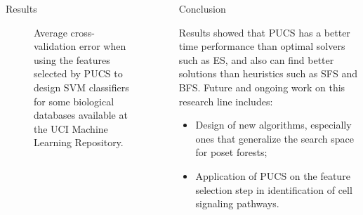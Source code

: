 \begin{frame}
\begin{columns}
{\begin{block}{Results}
\begin{figure}[h]
\centering
{}
\caption{Average cross-validation error when using the features selected by
    PUCS to design SVM classifiers for some biological databases available at the UCI Machine Learning Repository.}
\label{fig:svm_error}
\end{figure}

\end{block}



\begin{block}{Conclusion}%
{
Results showed that PUCS has a better time performance than optimal solvers such as ES, and also can find better solutions than heuristics such as SFS and BFS. Future and ongoing work on this research line includes:
\begin{itemize}
    \bigskip
    \item{Design of new algorithms, especially ones that generalize the search space for poset forests;}
    \bigskip
    \item{Application of PUCS on the feature selection step in identification of cell signaling pathways.}
\end{itemize}
}
\end{block}
}%
\end{columns}
\end{frame}

